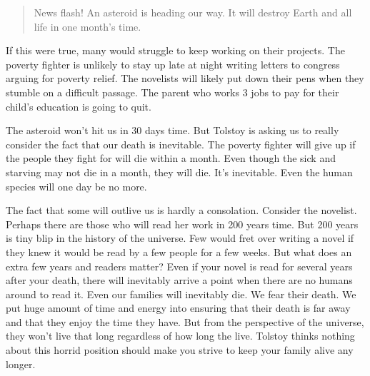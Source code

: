 \documentclass[]{article}
\begin{document}
\begin{quote}
News flash! An asteroid is heading our way. It will destroy Earth and
all life in one month's time.
\end{quote}

If this were true, many would struggle to keep working on their
projects. The poverty fighter is unlikely to stay up late at night
writing letters to congress arguing for poverty relief. The novelists
will likely put down their pens when they stumble on a difficult
passage. The parent who works 3 jobs to pay for their child's education
is going to quit.

The asteroid won't hit us in 30 days time. But Tolstoy is asking us to
really consider the fact that our death is inevitable. The poverty
fighter will give up if the people they fight for will die within a
month. Even though the sick and starving may not die in a month, they
will die. It's inevitable. Even the human species will one day be no
more.

The fact that some will outlive us is hardly a consolation. Consider the
novelist. Perhaps there are those who will read her work in 200 years
time. But 200 years is tiny blip in the history of the universe. Few
would fret over writing a novel if they knew it would be read by a few
people for a few weeks. But what does an extra few years and readers
matter? Even if your novel is read for several years after your death,
there will inevitably arrive a point when there are no humans around to
read it. Even our families will inevitably die. We fear their death. We
put huge amount of time and energy into ensuring that their death is far
away and that they enjoy the time they have. But from the perspective of
the universe, they won't live that long regardless of how long the live.
Tolstoy thinks nothing about this horrid position should make you strive
to keep your family alive any longer.
\end{document}
